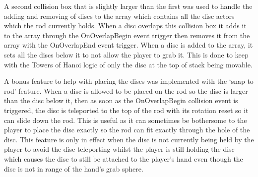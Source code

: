 \newline
\par
A second collision box that is slightly larger than the first was used to handle the adding and removing of discs to the array which contains all the disc actors which the rod currently holds. When a disc overlaps this collision box it adds it to the array through the OnOverlapBegin event trigger then removes it from the array with the OnOverlapEnd event trigger. When a disc is added to the array, it sets all the discs below it to not allow the player to grab it. This is done to keep with the Towers of Hanoi logic of only the disc at the top of stack being movable.
\newline
\par
A bonus feature to help with placing the discs was implemented with the `snap to rod' feature. When a disc is allowed to be placed on the rod so the disc is larger than the disc below it, then as soon as the OnOverlapBegin collision event is triggered, the disc is teleported to the top of the rod with its rotation reset so it can slide down the rod. This is useful as it can sometimes be bothersome to the player to place the disc exactly so the rod can fit exactly through the hole of the disc. This feature is only in effect when the disc is not currently being held by the player to avoid the disc teleporting whilst the player is still holding the disc which causes the disc to still be attached to the player's hand even though the disc is not in range of the hand's grab sphere.

